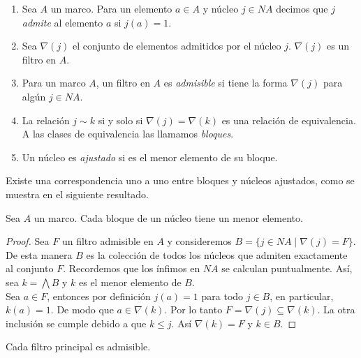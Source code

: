 \begin{dfn}\label{Filtroadmisible}
    \begin{enumerate}
        \item Sea $A$ un marco. Para un elemento $a\in A$ y núcleo $j\in NA$ decimos que $j$ \emph{admite} al elemento $a$ si $j(a)=1$.

        \item Sea $\nabla (j)$ el conjunto de elementos admitidos por el núcleo $j$. $\nabla(j)$ es un filtro en $A$.

        \item Para un marco $A$, un filtro en $A$ es \emph{admisible} si tiene la forma $\nabla(j)$ para algún $j\in NA$.

        \item La relación $j\sim k$ si y solo si $\nabla(j)=\nabla(k)$ es una relación de equivalencia. A las clases de equivalencia las llamamos \emph{bloques}.

        \item Un núcleo es \emph{ajustado} si es el menor elemento de su bloque.
    \end{enumerate}
\end{dfn}

Existe una correspondencia uno a uno entre bloques y núcleos ajustados, como se muestra en el siguiente resultado.

\begin{lem}\label{Menorelemento}
    Sea $A$ un marco. Cada bloque de un núcleo tiene un menor elemento.
\end{lem}

\begin{proof}
    Sea $F$ un filtro admisible en $A$ y consideremos $B=\{j\in NA\mid \nabla(j)=F\}$. De esta manera $B$ es la colección de todos los núcleos que admiten exactamente al conjunto $F$. Recordemos que los ínfimos en $NA$ se calculan puntualmente. Así, sea $k=\bigwedge B$ y $k$ es el menor elemento de $B$.\\

    Sea $a\in F$, entonces por definición $j(a)=1$ para todo $j\in B$, en particular, $k(a)=1$. De modo que $a\in \nabla(k)$. Por lo tanto $F=\nabla(j)\subseteq \nabla(k)$. La otra inclusión se cumple debido a que $k\leq j$. Así $\nabla(k)=F$ y $k\in B$.
\end{proof}

\begin{lem}
    Cada filtro principal es admisible.
\end{lem}

